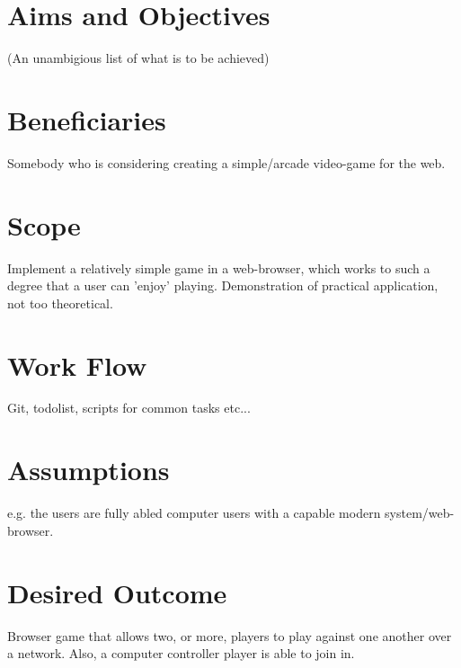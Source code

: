 \documentclass{standalone}
\begin{document}
	\section{Aims and Objectives}
		(An unambigious list of what is to be achieved)

	\section{Beneficiaries}
		Somebody who is considering creating a simple/arcade video-game for the web.

	\section{Scope}
		Implement a relatively simple game in a web-browser, which works to such a degree that a user can 'enjoy' playing. Demonstration of practical application, not too theoretical.

	\section{Work Flow}
		Git, todolist, scripts for common tasks etc...

	\section{Assumptions}
		e.g. the users are fully abled computer users with a capable modern system/web-browser.

	\section{Desired Outcome}
		Browser game that allows two, or more, players to play against one another over a network. Also, a computer controller player is able to join in.
\end{document}

